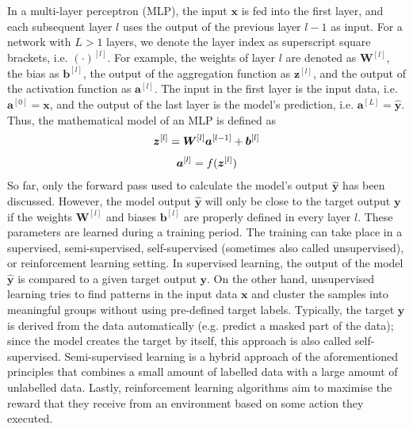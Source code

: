 In a multi-layer perceptron (MLP), the input \(\boldsymbol{x}\) is fed into the first layer, and each subsequent layer \(l\) uses the output of the previous layer \(l-1\) as input.
For a network with \(L>1\) layers, we denote the layer index as superscript square brackets, i.e. $(\cdot)^{[l]}$.
For example, the weights of layer $l$ are denoted as $\boldsymbol{W}^{[l]}$, the bias as \(\boldsymbol{b}^{[l]}\), the output of the aggregation function as \(\boldsymbol{z}^{[l]}\), and the output of the activation function as \(\boldsymbol{a}^{[l]}\).
The input in the first layer is the input data, i.e. $\boldsymbol{a}^{[0]} = \boldsymbol{x}$, and the output of the last layer is the model's prediction, i.e. $\boldsymbol{a}^{[L]} = \hat{\boldsymbol{y}}$. Thus, the mathematical model of an MLP is defined as
%
\begin{align}\eqlbl{mlp}
		\boldsymbol{z}^{[l]} = \boldsymbol{W}^{[l]}\boldsymbol{a}^{[l-1]} + \boldsymbol{b}^{[l]}
\end{align}
%
\begin{align}\eqlbl{mlp2}
		\boldsymbol{a}^{[l]} = f(\boldsymbol{z}^{[l]})
\end{align}
%
So far, only the forward pass used to calculate the model's output $\boldsymbol{\hat{y}}$ has been discussed.
However, the model output $\boldsymbol{\hat{y}}$ will only be close to the target output $\boldsymbol{y}$ if the weights $\boldsymbol{W}^{[l]}$ and biases $\boldsymbol{b}^{[l]}$ are properly defined in every layer $l$.
These parameters are learned during a training period.
The training can take place in a supervised, semi-supervised, self-supervised (sometimes also called unsupervised), or reinforcement learning setting.
In supervised learning, the output of the model $\boldsymbol{\hat{y}}$ is compared to a given target output $\boldsymbol{y}$.
On the other hand, unsupervised learning tries to find patterns in the input data $\boldsymbol{x}$ and cluster the samples into meaningful groups without using pre-defined target labels. Typically, the target $\boldsymbol{y}$ is derived from the data automatically (e.g. predict a masked part of the data); since the model creates the target by itself, this approach is also called self-supervised.
Semi-supervised learning is a hybrid approach of the aforementioned principles that combines a small amount of labelled data with a large amount of unlabelled data.
Lastly, reinforcement learning algorithms aim to maximise the reward that they receive from an environment based on some action they executed.

